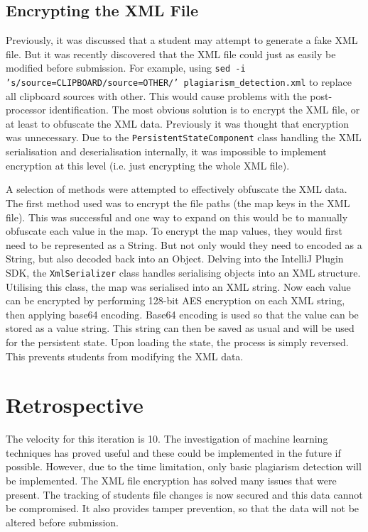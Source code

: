 \subsection{Encrypting the XML File}
Previously, it was discussed that a student may attempt to generate a fake XML file. But it was recently discovered that the XML file could just as easily be modified before submission. For example, using \texttt{sed -i 's/source=CLIPBOARD/source=OTHER/' plagiarism\_detection.xml} to replace all clipboard sources with other. This would cause problems with the post-processor identification. The most obvious solution is to encrypt the XML file, or at least to obfuscate the XML data. Previously it was thought that encryption was unnecessary. Due to the \texttt{PersistentStateComponent} class handling the XML serialisation and deserialisation internally, it was impossible to implement encryption at this level (i.e. just encrypting the whole XML file).

A selection of methods were attempted to effectively obfuscate the XML data. The first method used was to encrypt the file paths (the map keys in the XML file). This was successful and one way to expand on this would be to manually obfuscate each value in the map. To encrypt the map values, they would first need to be represented as a String. But not only would they need to encoded as a String, but also decoded back into an Object. Delving into the IntelliJ Plugin SDK, the \texttt{XmlSerializer} class handles serialising objects into an XML structure. Utilising this class, the map was serialised into an XML string. Now each value can be encrypted by performing 128-bit AES encryption on each XML string, then applying base64 encoding. Base64 encoding is used so that the value can be stored as a value string. This string can then be saved as usual and will be used for the persistent state. Upon loading the state, the process is simply reversed. This prevents students from modifying the XML data.

\section{Retrospective}
The velocity for this iteration is 10. The investigation of machine learning techniques has proved useful and these could be implemented in the future if possible. However, due to the time limitation, only basic plagiarism detection will be implemented. The XML file encryption has solved many issues that were present. The tracking of students file changes is now secured and this data cannot be compromised. It also provides tamper prevention, so that the data will not be altered before submission.
